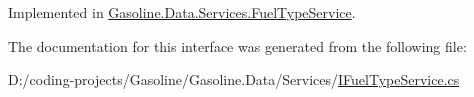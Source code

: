 Implemented in \mbox{\hyperlink{class_gasoline_1_1_data_1_1_services_1_1_fuel_type_service_a304619cc0643282249d7ce2619340eee}{Gasoline.\+Data.\+Services.\+Fuel\+Type\+Service}}.



The documentation for this interface was generated from the following file\+:\begin{DoxyCompactItemize}
\item 
D\+:/coding-\/projects/\+Gasoline/\+Gasoline.\+Data/\+Services/\mbox{\hyperlink{_i_fuel_type_service_8cs}{I\+Fuel\+Type\+Service.\+cs}}\end{DoxyCompactItemize}
